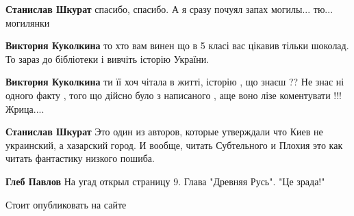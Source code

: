 \begin{itemize}
\begin{itemize}
\textbf{Станислав Шкурат} спасибо, спасибо. А я сразу почуял запах могилы... тю... могилянки \Smiley[1.0][yellow]

 
\textbf{Виктория Куколкина} то хто вам винен що в 5 класі вас цікавив тільки шоколад. То зараз до бібліотеки і вивчіть історію України.

 
\textbf{Виктория Куколкина} ти її хоч чітала в житті, історію , що знаєш ?? Не знає ні одного факту , того що дійсно було з написаного , аще воно лізе коментувати !!! Жрица....

 
\textbf{Станислав Шкурат} Это один из авторов, которые утверждали что Киев не украинский, а хазарский город. И вообще, читать Субтельного и Плохия это как читать фантастику низкого пошиба.

 
\textbf{Глеб Павлов} На угад открыл страницу 9. Глава "Древняя Русь". "Це зрада!"


\end{itemize}

 
Стоит опубликовать на сайте

\begin{itemize}

 

\end{itemize}
\end{itemize}
